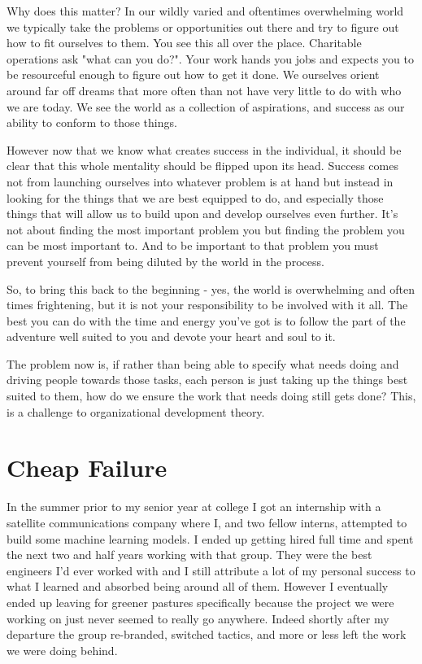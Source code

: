 \documentclass[11pt,a5paper]{book}
\begin{document}
Why does this matter? In our wildly varied and oftentimes overwhelming world we typically take the problems or opportunities out there and try to figure out how to fit ourselves to them. You see this all over the place. Charitable operations ask "what can you do?". Your work hands you jobs and expects you to be resourceful enough to figure out how to get it done. We ourselves orient around far off dreams that more often than not have very little to do with who we are today. We see the world as a collection of aspirations, and success as our ability to conform to those things. 
\newline

However now that we know what creates success in the individual, it should be clear that this whole mentality should be flipped upon its head. Success comes not from launching ourselves into whatever problem is at hand but instead in looking for the things that we are best equipped to do, and especially those things that will allow us to build upon and develop ourselves even further. It's not about finding the most important problem you but finding the problem you can be most important to. And to be important to that problem you must prevent yourself from being diluted by the world in the process. 
\newline

So, to bring this back to the beginning - yes, the world is overwhelming and often times frightening, but it is not your responsibility to be involved with it all. The best you can do with the time and energy you've got is to follow the part of the adventure well suited to you and devote your heart and soul to it. 
\newline

The problem now is, if rather than being able to specify what needs doing and driving people towards those tasks, each person is just taking up the things best suited to them, how do we ensure the work that needs doing still gets done? This, is a challenge to organizational development theory. 

\chapter{Cheap Failure}
In the summer prior to my senior year at college I got an internship with a satellite communications company where I, and two fellow interns, attempted to build some machine learning models. I ended up getting hired full time and spent the next two and half years working with that group. They were the best engineers I'd ever worked with and I still attribute a lot of my personal success to what I learned and absorbed being around all of them. However I eventually ended up leaving for greener pastures specifically because the project we were working on just never seemed to really go anywhere. Indeed shortly after my departure the group re-branded, switched tactics, and more or less left the work we were doing behind. 
\newline
\end{document}
